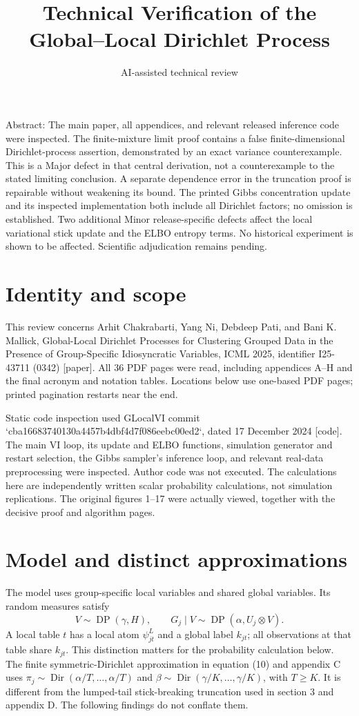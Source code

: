 \documentclass[10pt]{article}
\title{Technical Verification of the Global–Local Dirichlet Process}
\author{AI-assisted technical review}
\date{}
\begin{document}
\maketitle
Abstract: The main paper, all appendices, and relevant released inference code were inspected. The finite-mixture limit proof contains a false finite-dimensional Dirichlet-process assertion, demonstrated by an exact variance counterexample. This is a Major defect in that central derivation, not a counterexample to the stated limiting conclusion. A separate dependence error in the truncation proof is repairable without weakening its bound. The printed Gibbs concentration update and its inspected implementation both include all Dirichlet factors; no omission is established. Two additional Minor release-specific defects affect the local variational stick update and the ELBO entropy terms. No historical experiment is shown to be affected. Scientific adjudication remains pending.\par
\section*{Identity and scope}
This review concerns Arhit Chakrabarti, Yang Ni, Debdeep Pati, and Bani K. Mallick, Global-Local Dirichlet Processes for Clustering Grouped Data in the Presence of Group-Specific Idiosyncratic Variables, ICML 2025, identifier I25-43711 (0342) [paper]. All 36 PDF pages were read, including appendices A–H and the final acronym and notation tables. Locations below use one-based PDF pages; printed pagination restarts near the end.\par
Static code inspection used GLocalVI commit `cba16683740130a4457b4dbf4d7f086eebc00ed2`, dated 17 December 2024 [code]. The main VI loop, its update and ELBO functions, simulation generator and restart selection, the Gibbs sampler’s inference loop, and relevant real-data preprocessing were inspected. Author code was not executed. The calculations here are independently written scalar probability calculations, not simulation replications. The original figures 1–17 were actually viewed, together with the decisive proof and algorithm pages.\par
\section*{Model and distinct approximations}
The model uses group-specific local variables and shared global variables. Its random measures satisfy \[V\sim\operatorname{DP}(\gamma,H),\qquad
 G_j\mid V\sim\operatorname{DP}(\alpha,U_j\otimes V).\] A local table \(t\) has a local atom \(\psi^L_{jt}\) and a global label \(k_{jt}\); all observations at that table share \(k_{jt}\). This distinction matters for the probability calculation below. The finite symmetric-Dirichlet approximation in equation (10) and appendix C uses \(\pi_j\sim\operatorname{Dir}(\alpha/T,\ldots,\alpha/T)\) and \(\beta\sim\operatorname{Dir}(\gamma/K,\ldots,\gamma/K)\), with \(T\geq K\). It is different from the lumped-tail stick-breaking truncation used in section 3 and appendix D. The following findings do not conflate them.\par
\end{document}

